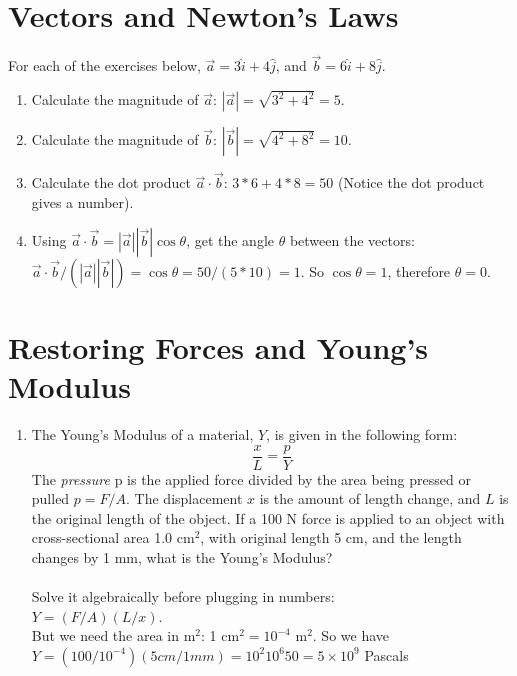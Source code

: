 \documentclass[10pt]{article}
\begin{document}
\maketitle

\section{Vectors and Newton's Laws}
For each of the exercises below, $\vec{a} = 3\hat{i} + 4\hat{j}$, and $\vec{b} = 6\hat{i}+8\hat{j}$.
\begin{enumerate}
\item Calculate the magnitude of $\vec{a}$: $|\vec{a}| = \sqrt{3^2+4^2} = 5$.
\item Calculate the magnitude of $\vec{b}$: $|\vec{b}| = \sqrt{4^2+8^2} = 10$.
\item Calculate the dot product $\vec{a} \cdot \vec{b}$: $3*6 + 4*8 = 50$ (Notice the dot product gives a number).
\item Using $\vec{a}\cdot\vec{b} = |\vec{a}||\vec{b}|\cos\theta$, get the angle $\theta$ between the vectors: $\vec{a}\cdot\vec{b}/(|\vec{a}||\vec{b}|) = \cos\theta = 50/(5*10) = 1$.  So $\cos\theta = 1$, therefore $\theta = 0$.
\end{enumerate}
\section{Restoring Forces and Young's Modulus}
\begin{enumerate}
\item The Young's Modulus of a material, $Y$, is given in the following form: \\
\begin{equation}
\frac{x}{L} = \frac{p}{Y}
\end{equation}
The \textit{pressure} p is the applied force divided by the area being pressed or pulled $p = F/A$.  The displacement $x$ is the amount of length change, and $L$ is the original length of the object.  If a 100 N force is applied to an object with cross-sectional area 1.0 cm$^2$, with original length 5 cm, and the length changes by 1 mm, what is the Young's Modulus? \\ \\
Solve it algebraically before plugging in numbers:\\
$Y = (F/A)(L/x)$. \\
But we need the area in m$^2$: 1 cm$^2 = 10^{-4}$ m$^2$.  So we have \\
$Y = (100/10^{-4})(5 cm / 1 mm) = 10^2 10^{6} 50 = 5 \times 10^{9}$ Pascals
\end{enumerate}
\end{document}
